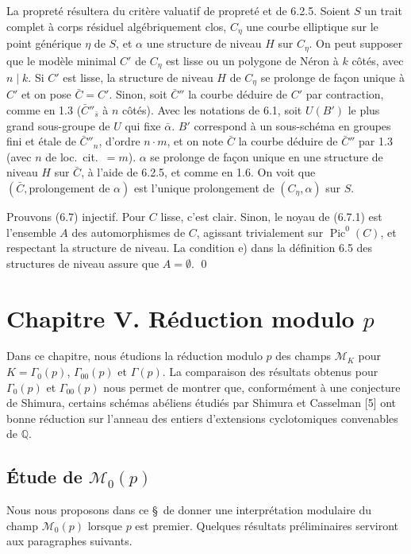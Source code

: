 \documentclass[11pt,a4paper]{amsart}
\theoremstyle{plain}
\theoremstyle{definition}
\DeclareMathOperator{\Pic}{Pic}
\newcommand{\mll}{\mathcal{M}}
\newcommand{\QQ}{\mathbb{Q}}
\begin{document}
La propret\'e r\'esultera du crit\`ere valuatif de propret\'e et de 6.2.5. Soient $S$ un trait complet \`a corps r\'esiduel alg\'ebriquement clos, $C_{\eta}$ une courbe elliptique sur le point g\'en\'erique $\eta$ de $S$, et $\alpha$ une structure de niveau $H$ sur $C_{\eta}$. On peut supposer que le mod\`ele minimal $C'$ de $C_{\eta}$ est lisse ou un polygone de N\'eron \`a $k$ c\^ot\'es, avec $n \mid k$. Si $C'$ est lisse, la structure de niveau $H$ de $C_{\eta}$ se prolonge de fa\c{c}on unique \`a $C'$ et on pose $\bar{C} = C'$. Sinon, soit $\bar{C}''$ la courbe d\'eduire de $C'$ par contraction, comme en 1.3 ($\bar{C}''_{\bar{s}}$ \`a $n$ c\^ot\'es). Avec les notations de 6.1, soit $U(B')$ le plus grand sous-groupe de $U$ qui fixe $\bar{\alpha}$. $B'$ correspond \`a un sous-sch\'ema en groupes fini et \'etale de $\bar{C}''_n$, d'ordre $n \cdot m$, et on note $\bar{C}$ la courbe d\'eduire de $\bar{C}''$ par 1.3 (avec $n$ de loc.\ cit.\ $= m$). $\alpha$ se prolonge de fa\c{c}on unique en une structure de niveau $H$ sur $\bar{C}$, \`a l'aide de 6.2.5, et comme en 1.6. On voit que $(\bar{C}, \text{prolongement de } \alpha)$ est l'unique prolongement de $(C_{\eta}, \alpha)$ sur $S$.

Prouvons (6.7) injectif. Pour $C$ lisse, c'est clair. Sinon, le noyau de (6.7.1) est l'ensemble $A$ des automorphismes de $C$, agissant trivialement sur $\Pic^0(C)$, et respectant la structure de niveau. La condition e) dans la d\'efinition 6.5 des structures de niveau assure que $A = \emptyset$.
\qed


\section{Chapitre V. R\'eduction modulo $p$}

Dans ce chapitre, nous \'etudions la r\'eduction modulo $p$ des champs $\mll_K$ pour $K = \Gamma_0(p)$, $\Gamma_{00}(p)$ et $\Gamma(p)$. La comparaison des r\'esultats obtenus pour $\Gamma_0(p)$ et $\Gamma_{00}(p)$ nous permet de montrer que, conform\'ement \`a une conjecture de Shimura, certains sch\'emas ab\'eliens \'etudi\'es par Shimura et Casselman [5] ont bonne r\'eduction sur l'anneau des entiers d'extensions cyclotomiques convenables de $\QQ$.

\subsection{\'Etude de $\mll_0(p)$}

Nous nous proposons dans ce \S\ de donner une interpr\'etation modulaire du champ $\mll_0(p)$ lorsque $p$ est premier. Quelques r\'esultats pr\'eliminaires serviront aux paragraphes suivants.
\end{document}
